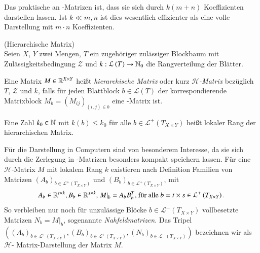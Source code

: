     Das praktische an \Rk-Matrizen ist, dass sie sich durch $k\left(m+n\right)$ Koeffizienten darstellen lassen. Ist $k \ll m,n$ ist dies wesentlich effizienter als eine volle Darstellung mit $m \cdot n$ 
    Koeffizienten. \citep{nichtlokop}
    
    \begin{defn}
    \label{def:hmat}
      (Hierarchische Matrix)\\
      Seien $X$, $Y$ zwei Mengen, $T$ ein zugehöriger zulässiger Blockbaum mit Zulässigkeitsbedingung $\mathcal{Z}$ und $k: \mathcal{L}\left(T\right) \to \mathbb{N}_0$ die Rangverteilung der Blätter.
      
      Eine Matrix $M \in \mathbb{R}^{X \times Y}$ heißt \textit{hierarchische Matrix} oder kurz \textit{$\mathcal{H}$-Matrix} bezüglich $T$, $\mathcal{Z}$ und $k$, falls für jeden Blattblock
      $b \in \mathcal{L}\left(T\right)$ der korrespondierende Matrixblock $M_b = \left(M_{ij}\right)_{\left(i,j\right) \in b}$ eine \Rk-Matrix ist.
      
      Eine Zahl $k_0 \in \mathbb{N}$ mit $k\left(b\right) \leq k_0$ für alle $b \in \mathcal{L}^+\left(T_{X \times Y}\right)$ heißt lokaler Rang der hierarchischen Matrix.
      
      \citep{h2diss, nichtlokop}
      
    \end{defn}

    Für die Darstellung in Computern sind \hmat von besonderem Interesse, da sie sich durch die Zerlegung in \Rk-Matrizen besonders kompakt speichern lassen. Für eine $\mathcal{H}$-Matrix
    $M$ mit lokalem Rang $k$ existieren nach Definition Familien von Matrizen $\left(A_b\right)_{b \in \mathcal{L}^+\left(T_{X \times Y}\right)} \text{ und } \left(B_b\right)_{b \in \mathcal{L}^+\left(T_{X \times Y}\right)}$, mit 
    \begin{equation*}
      A_b \in \mathbb{R}^{t \times k}, B_b \in \mathbb{R}^{s \times k}, \left. M \right|_b = A_bB_b^T \text{, für alle } b = t \times s \in \mathcal{L}^+\left(T_{X \times Y}\right).
    \end{equation*}
    So verbleiben nur noch für unzulässige Blöcke $b \in \mathcal{L}^-\left(T_{X \times Y}\right)$ vollbesetzte Matrizen $N_b = M|_b$, sogenannte \textit{Nahfeldmatrizen}.
    Das Tripel $\left( \left(A_b\right)_{b \in \mathcal{L}^+\left(T_{X \times Y}\right)} , \left(B_b\right)_{b \in \mathcal{L}^+\left(T_{X \times Y}\right)} , \left(N_b\right)_{b \in \mathcal{L}^-\left(T_{X \times Y}\right)} \right)$ bezeichnen wir als $\mathcal{H}$-
    Matrix-Darstellung der Matrix $M$. \citep{nichtlokop}
    
